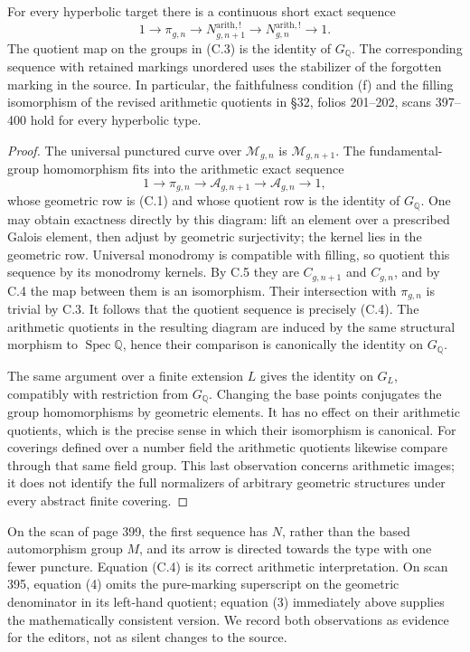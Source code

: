 For every hyperbolic target there is a continuous short exact
sequence
\[
 1\longrightarrow\pi_{g,n}
 \longrightarrow N^{\mathrm{arith},!}_{g,n+1}
 \longrightarrow N^{\mathrm{arith},!}_{g,n}
 \longrightarrow1.
 \tag{C.4}
\]
The quotient map on the groups in (C.3) is the identity of
$G_{\mathbb Q}$.  The corresponding sequence with retained
markings unordered uses the stabilizer of the forgotten marking
in the source.  In particular, the faithfulness condition (f) and
the filling isomorphism of the revised arithmetic quotients in
\S32, folios 201--202, scans 397--400 hold for every hyperbolic
type.

\begin{proof}
The universal punctured curve over $\mathcal M_{g,n}$ is
$\mathcal M_{g,n+1}$.  The fundamental-group homomorphism fits
into the arithmetic exact sequence
\[
 1\to\pi_{g,n}\to\mathcal A_{g,n+1}
 \to\mathcal A_{g,n}\to1,
\]
whose geometric row is (C.1) and whose quotient row is the
identity of $G_{\mathbb Q}$.  One may obtain exactness directly
by this diagram: lift an element over a prescribed Galois
element, then adjust by geometric surjectivity; the kernel lies
in the geometric row.  Universal monodromy is compatible with
filling, so quotient this sequence by its monodromy kernels.
By C.5 they are $C_{g,n+1}$ and $C_{g,n}$, and by C.4 the map
between them is an isomorphism.  Their intersection with
$\pi_{g,n}$ is trivial by C.3.  It follows that the quotient
sequence is precisely (C.4).  The arithmetic quotients in the
resulting diagram are induced by the same structural morphism
to $\operatorname{Spec}\mathbb Q$, hence their comparison is
canonically the identity on $G_{\mathbb Q}$.

The same argument over a finite extension $L$ gives the identity
on $G_L$, compatibly with restriction from $G_{\mathbb Q}$.
Changing the base points conjugates the group homomorphisms by
geometric elements.  It has no effect on their arithmetic
quotients, which is the precise sense in which their isomorphism
is canonical.  For coverings defined over a number field the
arithmetic quotients likewise compare through that same field
group.  This last observation concerns arithmetic images; it
does not identify the full normalizers of arbitrary geometric
structures under every abstract finite covering.
\end{proof}

On the scan of page 399, the first sequence has $N$, rather than
the based automorphism group $M$, and its arrow is directed
towards the type with one fewer puncture.  Equation (C.4) is its correct
arithmetic interpretation.  On scan 395, equation (4) omits the
pure-marking superscript on the geometric denominator in its
left-hand quotient; equation (3) immediately above supplies the
mathematically consistent version.  We record both observations
as evidence for the editors, not as silent changes to the source.

